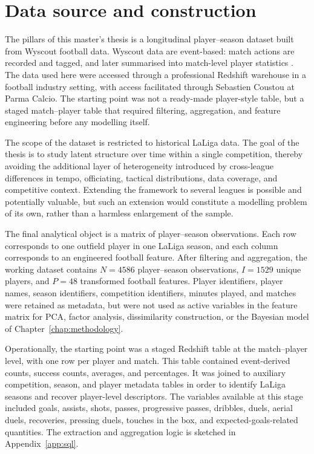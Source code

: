 \chapter{Data source and construction}
\label{chap:data_source}

The pillars of this master's thesis is a longitudinal player--season dataset built from Wyscout football data. Wyscout data are event-based: match actions are recorded and tagged, and later summarised into match-level player statistics \cite{wyscout_glossary}. The data used here were accessed through a professional Redshift warehouse in a football industry setting, with access facilitated through Sebastien Coustou at Parma Calcio. The starting point was not a ready-made player-style table, but a staged match--player table that required filtering, aggregation, and feature engineering before any modelling itself.

The scope of the dataset is restricted to historical LaLiga data. The goal of the thesis is to study latent structure over time within a single competition, thereby avoiding the additional layer of heterogeneity introduced by cross-league differences in tempo, officiating, tactical distributions, data coverage, and competitive context. Extending the framework to several leagues is possible and potentially valuable, but such an extension would constitute a modelling problem of its own, rather than a harmless enlargement of the sample.

The final analytical object is a matrix of player--season observations. Each row corresponds to one outfield player in one LaLiga season, and each column corresponds to an engineered football feature. After filtering and aggregation, the working dataset contains \(N=4586\) player--season observations, \(I = 1529\) unique players, and \(P = 48\) transformed football features. Player identifiers, player names, season identifiers, competition identifiers, minutes played, and matches were retained as metadata, but were not used as active variables in the feature matrix for PCA, factor analysis, dissimilarity construction, or the Bayesian model of Chapter~\ref{chap:methodology}.

Operationally, the starting point was a staged Redshift table at the match--player level, with one row per player and match. This table contained event-derived counts, success counts, averages, and percentages. It was joined to auxiliary competition, season, and player metadata tables in order to identify LaLiga seasons and recover player-level descriptors. The variables available at this stage included goals, assists, shots, passes, progressive passes, dribbles, duels, aerial duels, recoveries, pressing duels, touches in the box, and expected-goals-related quantities. The extraction and aggregation logic is sketched in Appendix~\ref{app:sql}.


